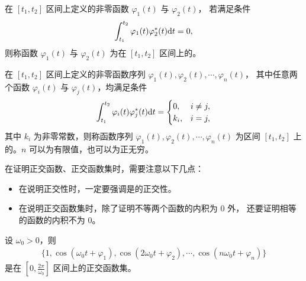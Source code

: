 \begin{definition}[正交函数与正交函数集]
    在 $[t_1, t_2]$ 区间上定义的非零函数 $\varphi_1(t)$ 与 $\varphi_2(t)$，
    若满足条件
    \begin{align*}
        \int_{t_1}^{t_2}\varphi_1(t)\varphi_2^*(t)\mathrm{d}t = 0,
    \end{align*}
    则称函数 $\varphi_1(t)$ 与 $\varphi_2(t)$ 为在 $[t_1, t_2]$ 区间上的。

    在 $[t_1, t_2]$ 区间上定义的非零函数序列 $\varphi_1(t), \varphi_2(t), \cdots, \varphi_n(t)$，
    其中任意两个函数 $\varphi_i(t)$ 与 $\varphi_j(t)$，均满足条件
    \begin{align*}
        \int_{t_1}^{t_2}\varphi_i(t)\varphi_j^*(t)\mathrm{d}t = \begin{cases}
            0, & i \ne j, \\
            k_i, & i = j,
        \end{cases}
    \end{align*}
    其中 $k_i$ 为非零常数，则称函数序列 $\varphi_1(t), \varphi_2(t), \cdots, \varphi_n(t)$
    为区间 $[t_1, t_2]$ 上的。$n$ 可以为有限值，也可以为正无穷。
\end{definition}

\begin{note}
    在证明正交函数、正交函数集时，需要注意以下几点：
    \begin{itemize}
        \item 在说明正交性时，一定要强调是的正交性。
        \item 在说明正交函数集时，除了证明不等两个函数的内积为 $0$ 外，
            还要证明相等的函数的内积不为 $0$。
    \end{itemize}
\end{note}

\begin{example}[三角函数集]
    设 $\omega_0 > 0$，则
    \begin{align*}
        \{1, \cos(\omega_0t + \varphi_1), \cos(2\omega_0t + \varphi_2),
            \cdots, \cos(n\omega_0 t + \varphi_n)\}
    \end{align*}
    是在 $[0, \frac{2\pi}{\omega_0}]$ 区间上的正交函数集。
\end{example}

